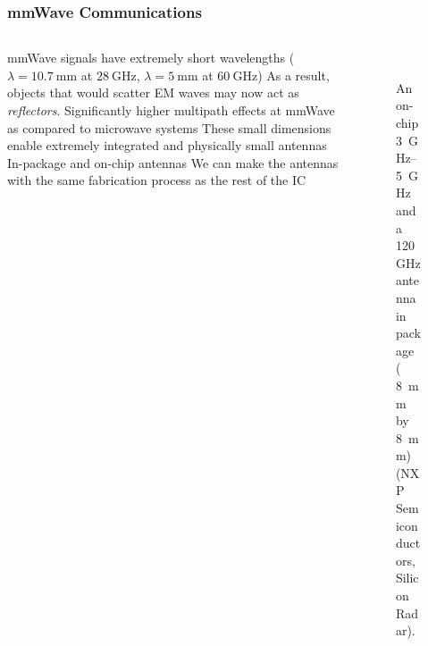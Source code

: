 \documentclass[10pt]{beamer}
\begin{document}
\begin{frame}
    \frametitle{mmWave Communications}
    \begin{columns}[T]
        \normalsize
        \begin{column}{.6\textwidth}
            \begin{outline}
                \1 mmWave signals have extremely short wavelengths ($\lambda = \SI{10.7}{\mm}$ at $\SI{28}{\GHz}$, $\lambda = \SI{5}{\mm}$ at $\SI{60}{\GHz}$)
                \1 As a result, objects that would scatter EM waves may now act as \textit{reflectors}.
                \2 Significantly higher multipath effects at mmWave as compared to microwave systems
                \1 These small dimensions enable extremely integrated and physically small antennas
                \2 In-package and on-chip antennas
                \2 We can make the antennas with the same fabrication process as the rest of the IC
            \end{outline}
        \end{column}
        \begin{column}{.4\textwidth}
            \scriptsize
            \begin{figure}[T!]
                \centering
                 \\
                \caption{\scriptsize An on-chip \SIrange{3}{5}{\GHz} and a  \SI{120}{\GHz} antenna in package ( \SI{8}{\mm} by \SI{8}{\mm}) (\textcopyright NXP Semiconductors, Silicon Radar).}
                \label{fig:antenna_on_chip}
            \end{figure}
        \end{column}
    \end{columns}
\end{frame}
\end{document}
